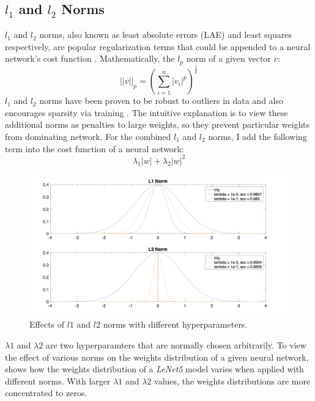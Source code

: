 \documentclass[a4paper,12pt]{report}
\begin{document}
\subsection{$l_1$ and $l_2$ Norms}
$l_1$ and $l_2$ norms, also known as least absolute errors (LAE) and least squares
respectively, are popular regularization terms that could be appended to a
neural network's cost function \cite{nie2010efficient}.
Mathematically, the $l_p$ norm of a given vector $v$:
\begin{equation}
    ||v||_p = (\sum_{i=1}^{n}|v_i|^p)^{\frac{1}{p}}
\end{equation}
$l_1$ and $l_2$ norms have been proven to be robust to outliers in
data and also encourages sparsity via training \cite{nie2010efficient}.
The intuitive explanation is to view these additional norms as penalties to
large weights, so they prevent particular weights from dominating network.
For the combined $l_1$ and $l_2$ norms, I add the following term into the cost
function of a neural network:
\begin{equation}
\lambda_{1}|w| + \lambda_{2}|w|^{2}
\label{equ:norms}
\end{equation}

\begin{figure}[!h]
\centering
\includegraphics[width=\textwidth]{l1l2norm.png}
\caption{\label{fig:l1l2norm}Effects of $l1$ and $l2$ norms with different hyperparameters.}
\end{figure}

$\lambda{1}$ and $\lambda{2}$ are two hyperparamters that
are normally chosen arbitrarily.
To view the effect of various norms on the weights distribution of a
given neural network,  shows how the weights distribution
of a \textit{LeNet5} model varies when applied with different norms.
With larger $\lambda{1}$ and $\lambda{2}$ values, the weights distributions
are more concentrated to zeros.
\end{document}
